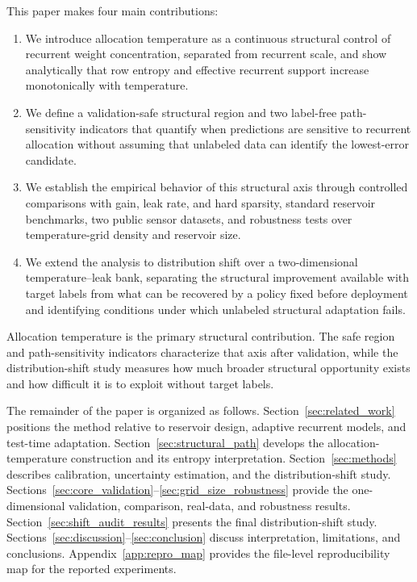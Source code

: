 \documentclass[preprint,12pt,authoryear]{elsarticle}
\begin{document}
This paper makes four main contributions:
\begin{enumerate}[leftmargin=*]
  \item We introduce allocation temperature as a continuous structural control of recurrent weight concentration, separated from recurrent scale, and show analytically that row entropy and effective recurrent support increase monotonically with temperature.
  \item We define a validation-safe structural region and two label-free path-sensitivity indicators that quantify when predictions are sensitive to recurrent allocation without assuming that unlabeled data can identify the lowest-error candidate.
  \item We establish the empirical behavior of this structural axis through controlled comparisons with gain, leak rate, and hard sparsity, standard reservoir benchmarks, two public sensor datasets, and robustness tests over temperature-grid density and reservoir size.
  \item We extend the analysis to distribution shift over a two-dimensional temperature--leak bank, separating the structural improvement available with target labels from what can be recovered by a policy fixed before deployment and identifying conditions under which unlabeled structural adaptation fails.
\end{enumerate}

Allocation temperature is the primary structural contribution. The safe region and path-sensitivity indicators characterize that axis after validation, while the distribution-shift study measures how much broader structural opportunity exists and how difficult it is to exploit without target labels.

The remainder of the paper is organized as follows. Section~\ref{sec:related_work} positions the method relative to reservoir design, adaptive recurrent models, and test-time adaptation. Section~\ref{sec:structural_path} develops the allocation-temperature construction and its entropy interpretation. Section~\ref{sec:methods} describes calibration, uncertainty estimation, and the distribution-shift study. Sections~\ref{sec:core_validation}--\ref{sec:grid_size_robustness} provide the one-dimensional validation, comparison, real-data, and robustness results. Section~\ref{sec:shift_audit_results} presents the final distribution-shift study. Sections~\ref{sec:discussion}--\ref{sec:conclusion} discuss interpretation, limitations, and conclusions. Appendix~\ref{app:repro_map} provides the file-level reproducibility map for the reported experiments.
\end{document}
